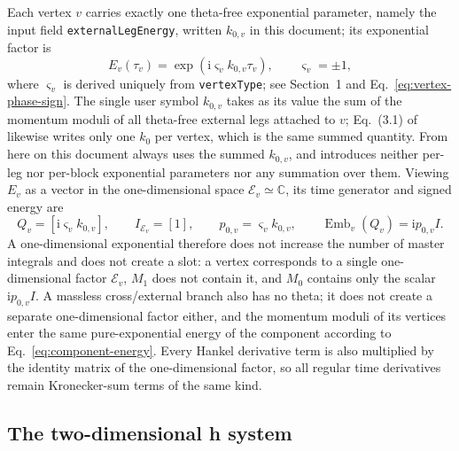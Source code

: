 \documentclass[11pt,a4paper]{article}
\newcommand{\ii}{\mathrm i}
\newcommand{\cE}{\mathcal E}
\newcommand{\Emb}{\operatorname{Emb}}
\begin{document}
Each vertex $v$ carries exactly one theta-free exponential parameter, namely the input field \texttt{externalLegEnergy}, written $k_{0,v}$ in this document; its exponential factor is
\begin{equation}
 E_v(\tau_v)
 =\exp\!\left(\ii\varsigma_vk_{0,v}\tau_v\right),
 \qquad \varsigma_v=\pm1,
 \label{eq:phase-exponent-block}
\end{equation}
where $\varsigma_v$ is derived uniquely from \texttt{vertexType}; see Section~1 and Eq.~\eqref{eq:vertex-phase-sign}. The single user symbol $k_{0,v}$ takes as its value the sum of the momentum moduli of all theta-free external legs attached to $v$; Eq.~(3.1) of \cite{Chen:2023eic} likewise writes only one $k_0$ per vertex, which is the same summed quantity. From here on this document always uses the summed $k_{0,v}$, and introduces neither per-leg nor per-block exponential parameters nor any summation over them. Viewing $E_v$ as a vector in the one-dimensional space $\cE_v\simeq\mathbb C$, its time generator and signed energy are
\begin{equation}
 Q_v=[\ii\varsigma_vk_{0,v}],
 \qquad I_{\cE_v}=[1],
 \qquad p_{0,v}=\varsigma_vk_{0,v},
 \qquad \Emb_v(Q_v)=\ii p_{0,v}I.
 \label{eq:exponential-1d}
\end{equation}
A one-dimensional exponential therefore does not increase the number of master integrals and does not create a slot: a vertex corresponds to a single one-dimensional factor $\cE_v$, $M_1$ does not contain it, and $M_0$ contains only the scalar $\ii p_{0,v}I$. A massless cross/external branch also has no theta; it does not create a separate one-dimensional factor either, and the momentum moduli of its vertices enter the same pure-exponential energy of the component according to Eq.~\eqref{eq:component-energy}. Every Hankel derivative term is also multiplied by the identity matrix of the one-dimensional factor, so all regular time derivatives remain Kronecker-sum terms of the same kind.

\subsection{The two-dimensional h system}
\end{document}
